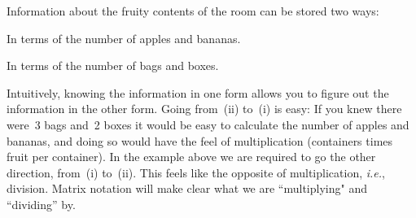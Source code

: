 %
\noindent
Information about the fruity contents of the room can be stored two ways: 
\begin{enumext}[label=\roman*,wrap-label=(#1)]
\item In terms of the number of apples and bananas. 
\item In terms of the number of bags and boxes. 
\end{enumext}
Intuitively, knowing the information in one form allows you to figure out the information in the other form. 
Going from~(ii) to~(i) is easy: 
If you knew there were~3 bags and~2 boxes it would be easy to calculate the number of apples and bananas, and doing so would have the feel of multiplication (containers times fruit per container). 
In the example above we are required to go the other direction, from~(i) to~(ii). This  feels like the opposite of multiplication, {\it i.e.}, division. Matrix notation will 
make clear what we are ``multiplying" and ``dividing'' by. 

